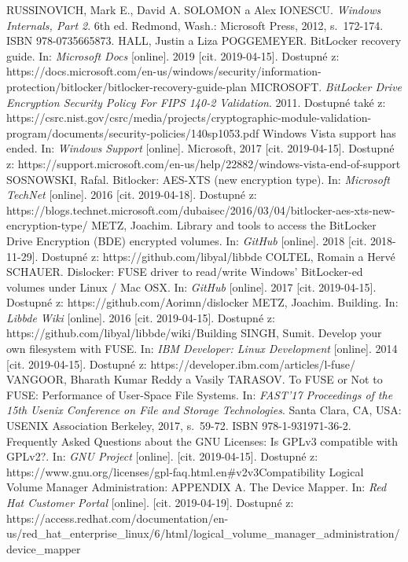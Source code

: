 \documentclass[a4paper,12pt]{article}
\begin{document}
{RUSSINOVICH, Mark E., David A. SOLOMON a Alex IONESCU. \textit{Windows Internals, Part 2}. 6th ed. Redmond, Wash.: Microsoft Press, 2012, s.~172-174. ISBN 978-0735665873.
HALL, Justin a Liza POGGEMEYER. BitLocker recovery guide. In: \textit{Microsoft Docs} [online]. 2019 [cit. 2019-04-15]. Dostupné z: https://docs.microsoft.com/en-us/windows/security/information-protection/bitlocker/bitlocker-recovery-guide-plan
MICROSOFT. \textit{BitLocker Drive Encryption Security Policy For FIPS 140-2 Validation}. 2011. Dostupné také z: https://csrc.nist.gov/csrc/media/projects/cryptographic-module-validation-program/documents/security-policies/140sp1053.pdf
Windows Vista support has ended. In: \textit{Windows Support} [online]. Microsoft, 2017 [cit. 2019-04-15]. Dostupné z: https://support.microsoft.com/en-us/help/22882/windows-vista-end-of-support
SOSNOWSKI, Rafal. Bitlocker: AES-XTS (new encryption type). In: \textit{Microsoft TechNet} [online]. 2016 [cit. 2019-04-18]. Dostupné z: https://blogs.technet.microsoft.com/dubaisec/2016/03/04/bitlocker-aes-xts-new-encryption-type/
METZ, Joachim. Library and tools to access the BitLocker Drive Encryption (BDE) encrypted volumes. In: \textit{GitHub} [online]. 2018 [cit. 2018-11-29]. Dostupné z: https://github.com/libyal/libbde
COLTEL, Romain a Hervé SCHAUER. Dislocker: FUSE driver to read/write Windows' BitLocker-ed volumes under Linux / Mac OSX. In: \textit{GitHub} [online]. 2017 [cit. 2019-04-15]. Dostupné z: https://github.com/Aorimn/dislocker
METZ, Joachim. Building. In: \textit{Libbde Wiki} [online]. 2016 [cit. 2019-04-15]. Dostupné z: https://github.com/libyal/libbde/wiki/Building
SINGH, Sumit. Develop your own filesystem with FUSE. In: \textit{IBM Developer: Linux Development} [online]. 2014 [cit. 2019-04-15]. Dostupné z: https://developer.ibm.com/articles/l-fuse/
VANGOOR, Bharath Kumar Reddy a Vasily TARASOV. To FUSE or Not to FUSE: Performance of User-Space File Systems. In: \textit{FAST'17 Proceedings of the 15th Usenix Conference on File and Storage Technologies}. Santa Clara, CA, USA: USENIX Association Berkeley, 2017, s.~59-72. ISBN 978-1-931971-36-2.
Frequently Asked Questions about the GNU Licenses: Is GPLv3 compatible with GPLv2?. In: \textit{GNU Project} [online]. [cit. 2019-04-15]. Dostupné z: https://www.gnu.org/licenses/gpl-faq.html.en\#v2v3Compatibility
Logical Volume Manager Administration: APPENDIX A. The Device Mapper. In: \textit{Red Hat Customer Portal} [online]. [cit. 2019-04-19]. Dostupné z: https://access.redhat.com/documentation/en-us/red\_hat\_enterprise\_linux/6/html/logical\_volume\_manager\_administration/\\device\_mapper
}
\end{document}
